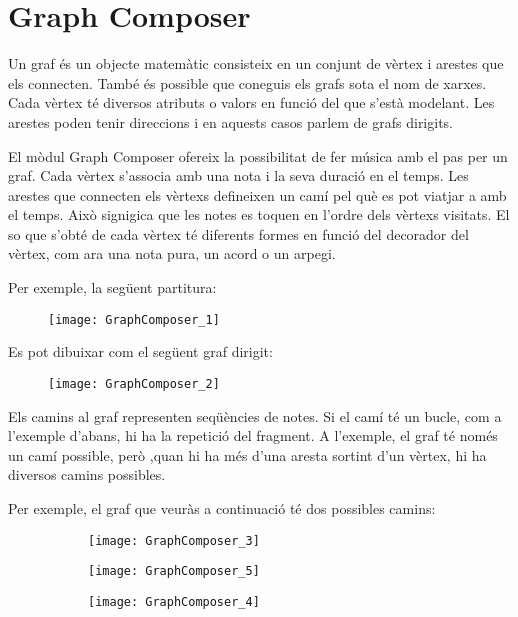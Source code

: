 \section{Graph Composer}
Un graf és un objecte matemàtic consisteix en un conjunt de vèrtex i arestes que els connecten. També és possible que coneguis els grafs sota el nom de xarxes. Cada vèrtex té diversos atributs o valors en funció del que s'està modelant. Les arestes poden tenir direccions i en aquests casos parlem de grafs dirigits.

El mòdul Graph Composer ofereix la possibilitat de fer música amb el pas per un graf. Cada vèrtex s'associa amb una nota i la seva duració en el temps. Les arestes que connecten els vèrtexs defineixen un camí pel què es pot viatjar a amb el temps. Això signigica que les notes es toquen en l'ordre dels vèrtexs visitats. El so que s'obté de cada vèrtex té diferents formes en funció del decorador del vèrtex, com ara una nota pura, un acord o un arpegi.

Per exemple, la següent partitura:
\begin{figure}[h]
\centering
\texttt{[image: GraphComposer\_1]}
\end{figure}

Es pot dibuixar com el següent graf dirigit:

\begin{figure}[h]
\centering
\texttt{[image: GraphComposer\_2]}
\end{figure}

Els camins al graf representen seqüències de notes. Si el camí té un bucle, com a l'exemple d'abans, hi ha la repetició del fragment. A l'exemple, el graf té només un camí possible, però ,quan hi ha més d'una aresta sortint d'un vèrtex, hi ha diversos camins possibles.

Per exemple, el graf que veuràs a continuació té dos possibles camins:

\begin{figure}[h]
\centering
\begin{subfigure}{0.45\textwidth}
\centering
\texttt{[image: GraphComposer\_3]}
\end{subfigure}

\begin{subfigure}{0.45\textwidth}
\centering
\texttt{[image: GraphComposer\_5]}
\end{subfigure}
\begin{subfigure}{0.45\textwidth}
\centering
\texttt{[image: GraphComposer\_4]}
\end{subfigure}
\end{figure}

